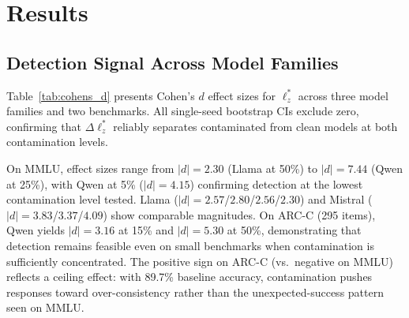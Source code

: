 \section{Results}
\label{sec:results}

\begin{table}[t]
\centering
\caption{Cohen's $d$ for $\Delta\ell_z^*$ across model families ($n{=}10$ clean seeds). Single-seed conditions: percentile bootstrap 95\% CI (10,000 resamples). $^{\dagger}$Multi-seed conditions: mean $\pm$ SD ($n{=}3$ independent runs). All single-seed CIs exclude zero.}
\label{tab:cohens_d}
\footnotesize
{}
\end{table}

\subsection{Detection Signal Across Model Families}
\label{sec:detection}

Table~\ref{tab:cohens_d} presents Cohen's $d$ effect sizes for $\ell_z^*$ across three model families and two benchmarks.
All single-seed bootstrap CIs exclude zero, confirming that $\Delta\ell_z^*$ reliably separates contaminated from clean models at both contamination levels.

On MMLU, effect sizes range from $|d|{=}2.30$ (Llama at 50\%) to $|d|{=}7.44$ (Qwen at 25\%), with Qwen at 5\% ($|d|{=}4.15$) confirming detection at the lowest contamination level tested. Llama ($|d|{=}2.57$/$2.80$/$2.56$/$2.30$) and Mistral ($|d|{=}3.83$/$3.37$/$4.09$) show comparable magnitudes.
On ARC-C (295 items), Qwen yields $|d|{=}3.16$ at 15\% and $|d|{=}5.30$ at 50\%, demonstrating that detection remains feasible even on small benchmarks when contamination is sufficiently concentrated.
The positive sign on ARC-C (vs.\ negative on MMLU) reflects a ceiling effect: with 89.7\% baseline accuracy, contamination pushes responses toward over-consistency rather than the unexpected-success pattern seen on MMLU.

